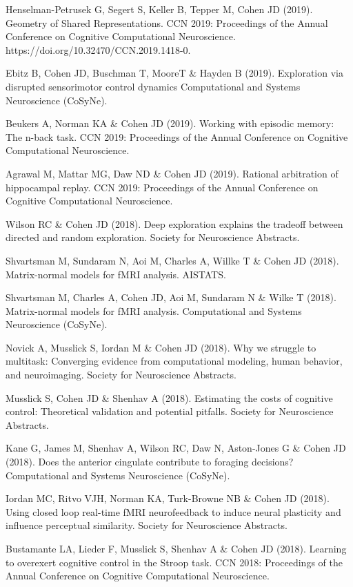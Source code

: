 \documentclass[10 pt]{article}
\begin{document}
Henselman-Petrusek G, Segert S, Keller B, Tepper M, Cohen JD (2019). Geometry of Shared Representations. CCN 2019: Proceedings of the Annual Conference on Cognitive Computational Neuroscience. https://doi.org/10.32470/CCN.2019.1418-0.

Ebitz B, Cohen JD, Buschman T, MooreT \& Hayden B (2019). Exploration via disrupted sensorimotor control dynamics Computational and Systems Neuroscience (CoSyNe).

Beukers A, Norman KA \& Cohen JD (2019). Working with episodic memory: The n-back task. CCN 2019: Proceedings of the Annual Conference on Cognitive Computational Neuroscience.

Agrawal M, Mattar MG, Daw ND \& Cohen JD (2019). Rational arbitration of hippocampal replay. CCN 2019: Proceedings of the Annual Conference on Cognitive Computational Neuroscience.

Wilson RC \& Cohen JD (2018). Deep exploration explains the tradeoff between directed and random exploration. Society for Neuroscience Abstracts.

Shvartsman M, Sundaram N, Aoi M, Charles A, Willke T \& Cohen JD (2018). Matrix-normal models for fMRI analysis. AISTATS.

Shvartsman M, Charles A, Cohen JD, Aoi M, Sundaram N \& Wilke T (2018). Matrix-normal models for fMRI analysis. Computational and Systems Neuroscience (CoSyNe).

Novick A, Musslick S, Iordan M \& Cohen JD (2018). Why we struggle to multitask: Converging evidence from computational modeling, human behavior, and neuroimaging. Society for Neuroscience Abstracts.

Musslick S, Cohen JD \& Shenhav A (2018). Estimating the costs of cognitive control: Theoretical validation and potential pitfalls. Society for Neuroscience Abstracts.

Kane G, James M, Shenhav A, Wilson RC, Daw N, Aston-Jones G \& Cohen JD (2018). Does the anterior cingulate contribute to foraging decisions? Computational and Systems Neuroscience (CoSyNe).

Iordan MC, Ritvo VJH, Norman KA, Turk-Browne NB \& Cohen JD (2018). Using closed loop real-time fMRI neurofeedback to induce neural plasticity and influence perceptual similarity. Society for Neuroscience Abstracts.

Bustamante LA, Lieder F, Musslick S, Shenhav A \& Cohen JD (2018). Learning to overexert cognitive control in the Stroop task. CCN 2018: Proceedings of the Annual Conference on Cognitive
Computational Neuroscience.
\end{document}
